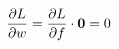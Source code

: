 \documentclass[preview]{standalone}
\begin{document}
\begin{align*}
\special{dvisvgm:raw <g id='unique000'>}\frac{\partial L}{\partial w} = \frac{\partial L}{\partial f} \cdot \mathbf{0} = 0\special{dvisvgm:raw </g>}
\end{align*}
\end{document}
